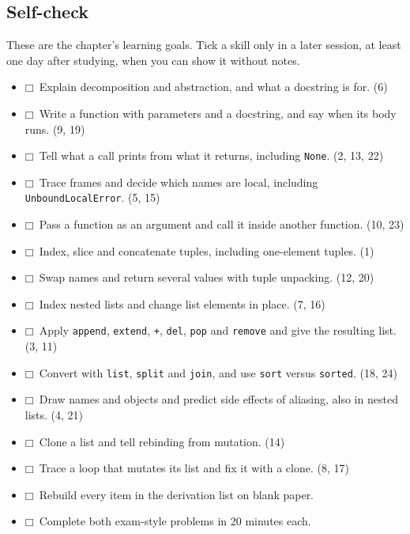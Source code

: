\documentclass[11pt]{article}
\begin{document}
\begin{keepsection}
\section{Self-check}

These are the chapter’s learning goals. Tick a skill only in a later session, at least one day after studying, when you can show it without notes.

\begin{itemize}
\item $\mdlgwhtsquare$\ Explain decomposition and abstraction, and what a docstring is for. (6)
\item $\mdlgwhtsquare$\ Write a function with parameters and a docstring, and say when its body runs. (9, 19)
\item $\mdlgwhtsquare$\ Tell what a call prints from what it returns, including \texttt{None}. (2, 13, 22)
\item $\mdlgwhtsquare$\ Trace frames and decide which names are local, including \texttt{UnboundLocalError}. (5, 15)
\item $\mdlgwhtsquare$\ Pass a function as an argument and call it inside another function. (10, 23)
\item $\mdlgwhtsquare$\ Index, slice and concatenate tuples, including one-element tuples. (1)
\item $\mdlgwhtsquare$\ Swap names and return several values with tuple unpacking. (12, 20)
\item $\mdlgwhtsquare$\ Index nested lists and change list elements in place. (7, 16)
\item $\mdlgwhtsquare$\ Apply \texttt{append}, \texttt{extend}, \texttt{+}, \texttt{del}, \texttt{pop} and \texttt{remove} and give the resulting list. (3, 11)
\item $\mdlgwhtsquare$\ Convert with \texttt{list}, \texttt{split} and \texttt{join}, and use \texttt{sort} versus \texttt{sorted}. (18, 24)
\item $\mdlgwhtsquare$\ Draw names and objects and predict side effects of aliasing, also in nested lists. (4, 21)
\item $\mdlgwhtsquare$\ Clone a list and tell rebinding from mutation. (14)
\item $\mdlgwhtsquare$\ Trace a loop that mutates its list and fix it with a clone. (8, 17)
\item $\mdlgwhtsquare$\ Rebuild every item in the derivation list on blank paper.
\item $\mdlgwhtsquare$\ Complete both exam-style problems in 20 minutes each.
\end{itemize}
\end{keepsection}
\end{document}
